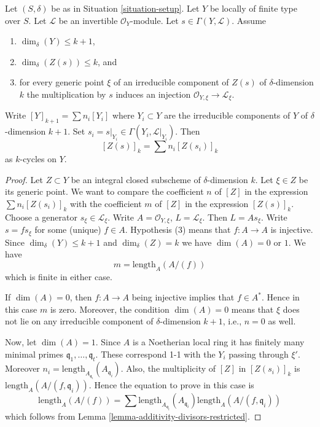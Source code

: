 \begin{lemma}
\label{lemma-prepare-geometric-cap}
Let $(S, \delta)$ be as in Situation \ref{situation-setup}.
Let $Y$ be locally of finite type over $S$.
Let $\mathcal{L}$ be an invertible $\mathcal{O}_Y$-module.
Let $s \in \Gamma(Y, \mathcal{L})$.
Assume
\begin{enumerate}
\item $\dim_\delta(Y) \leq k + 1$,
\item $\dim_\delta(Z(s)) \leq k$, and
\item for every generic point $\xi$ of an irreducible component of
$Z(s)$ of $\delta$-dimension $k$ the multiplication by $s$
induces an injection $\mathcal{O}_{Y, \xi} \to \mathcal{L}_\xi$.
\end{enumerate}
Write $[Y]_{k + 1} = \sum n_i[Y_i]$ where $Y_i \subset Y$ are the
irreducible components of $Y$ of $\delta$-dimension $k + 1$.
Set $s_i = s|_{Y_i} \in \Gamma(Y_i, \mathcal{L}|_{Y_i})$. Then
\begin{equation}
\label{equation-equal-as-cycles}
[Z(s)]_k =  \sum n_i[Z(s_i)]_k
\end{equation}
as $k$-cycles on $Y$.
\end{lemma}

\begin{proof}
Let $Z \subset Y$ be an integral closed subscheme of
$\delta$-dimension $k$. Let $\xi \in Z$ be its generic point.
We want to compare the coefficient $n$ of $[Z]$ in the expression
$\sum n_i[Z(s_i)]_k$ with the coefficient $m$ of $[Z]$ in the
expression $[Z(s)]_k$. Choose a generator $s_\xi \in \mathcal{L}_\xi$.
Write $A = \mathcal{O}_{Y, \xi}$, $L = \mathcal{L}_\xi$.
Then $L = As_\xi$. Write $s = f s_\xi$ for some (unique) $f \in A$.
Hypothesis (3) means that $f : A \to A$ is injective.
Since $\dim_\delta(Y) \leq k + 1$ and $\dim_\delta(Z) = k$
we have $\dim(A) = 0$ or $1$. We have
$$
m = \text{length}_A(A/(f))
$$
which is finite in either case.

\medskip\noindent
If $\dim(A) = 0$, then $f : A \to A$ being injective
implies that $f \in A^*$. Hence in this case $m$ is zero.
Moreover, the condition $\dim(A) = 0$ means that $\xi$
does not lie on any irreducible component of $\delta$-dimension
$k + 1$, i.e., $n = 0$ as well.

\medskip\noindent
Now, let $\dim(A) = 1$.
Since $A$ is a Noetherian local ring it has finitely
many minimal primes $\mathfrak q_1, \ldots, \mathfrak q_t$.
These correspond 1-1 with the $Y_i$ passing through $\xi'$.
Moreover $n_i = \text{length}_{A_{\mathfrak q_i}}(A_{\mathfrak q_i})$.
Also, the multiplicity of $[Z]$ in $[Z(s_i)]_k$ is
$\text{length}_A(A/(f, \mathfrak q_i))$.
Hence the equation to prove in this case is
$$
\text{length}_A(A/(f))
=
\sum \text{length}_{A_{\mathfrak q_i}}(A_{\mathfrak q_i})
\text{length}_A(A/(f, \mathfrak q_i))
$$
which follows from
Lemma \ref{lemma-additivity-divisors-restricted}.
\end{proof}

